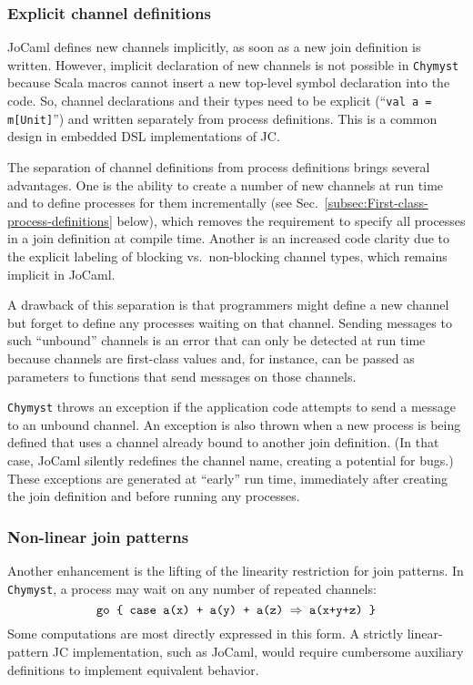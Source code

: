 \documentclass[sigplan,10pt]{acmart}\settopmatter{}
\begin{document}
\subsubsection{Explicit channel definitions}

JoCaml defines new channels implicitly, as soon as a new join definition
is written. However, implicit declaration of new channels is not possible
in \texttt{Chymyst} because Scala macros cannot insert a new top-level
symbol declaration into the code. So, channel declarations and their
types need to be explicit (``\texttt{val a = m{[}Unit{]}}'') and
written separately from process definitions. This is a common design
in embedded DSL implementations of JC.

The separation of channel definitions from process definitions brings
several advantages. One is the ability to create a number of new channels
at run time and to define processes for them incrementally (see Sec.~\ref{subsec:First-class-process-definitions}
below), which removes the requirement to specify all processes in
a join definition at compile time. Another is an increased code clarity
due to the explicit labeling of blocking vs.~non-blocking channel
types, which remains implicit in JoCaml.

A drawback of this separation is that programmers might define a new
channel but forget to define any processes waiting on that channel.
Sending messages to such ``unbound'' channels is an error that can
only be detected at run time because channels are first-class values
and, for instance, can be passed as parameters to functions that send
messages on those channels. 

\texttt{Chymyst} throws an exception if the application code attempts
to send a message to an unbound channel. An exception is also thrown
when a new process is being defined that uses a channel already bound
to another join definition. (In that case, JoCaml silently redefines
the channel name, creating a potential for bugs.) These exceptions
are generated at ``early'' run time, immediately after creating
the join definition and before running any processes.

\subsubsection{Non-linear join patterns\label{subsec:Non-linear-join-patterns}}

Another enhancement is the lifting of the linearity restriction for
join patterns. In \texttt{Chymyst}, a process may wait on any number
of repeated channels:
\[
\text{\texttt{go \{ case a(x) + a(y) + a(z) \ensuremath{\Rightarrow} a(x+y+z) \}}}
\]
Some computations are most directly
expressed in this form. A strictly linear-pattern JC implementation,
such as JoCaml, would require cumbersome auxiliary definitions to
implement equivalent behavior.
\end{document}
